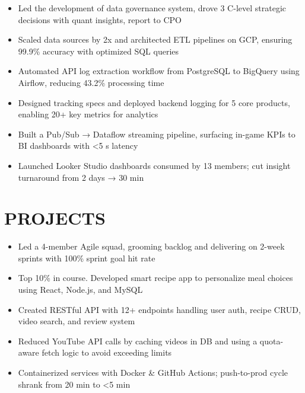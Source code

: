 \documentclass{resume}
\begin{document}
\begin{itemize}
  \item Led the development of data governance system, drove 3 C-level strategic decisions with quant insights, report to CPO
  \item Scaled data sources by 2x and architected ETL pipelines on GCP, ensuring 99.9\% accuracy with optimized SQL queries  
  \item Automated API log extraction workflow from PostgreSQL to BigQuery using Airflow, reducing 43.2\% processing time
  \item Designed tracking specs and deployed backend logging for 5 core products, enabling 20+ key metrics for analytics
  \item Built a Pub/Sub → Dataflow streaming pipeline, surfacing in-game KPIs to BI dashboards with <5 s latency
  \item Launched Looker Studio dashboards consumed by 13 members; cut insight turnaround from 2 days → 30 min



\end{itemize}








\section[PROJECTS]{PROJECTS}




 {}

\begin{itemize}
        \item Led a 4-member Agile squad, grooming backlog and delivering on 2-week sprints with 100\% sprint goal hit rate
	\item Top 10\% in course. Developed smart recipe app to personalize meal choices using React, Node.js, and MySQL %
	\item Created RESTful API with 12+ endpoints handling user auth, recipe CRUD, video search, and review system
  \item Reduced YouTube API calls by caching videos in DB and using a quota-aware fetch logic to avoid exceeding limits
  \item Containerized services with Docker \& GitHub Actions; push-to-prod cycle shrank from 20 min to <5 min




\end{itemize}
\end{document}
